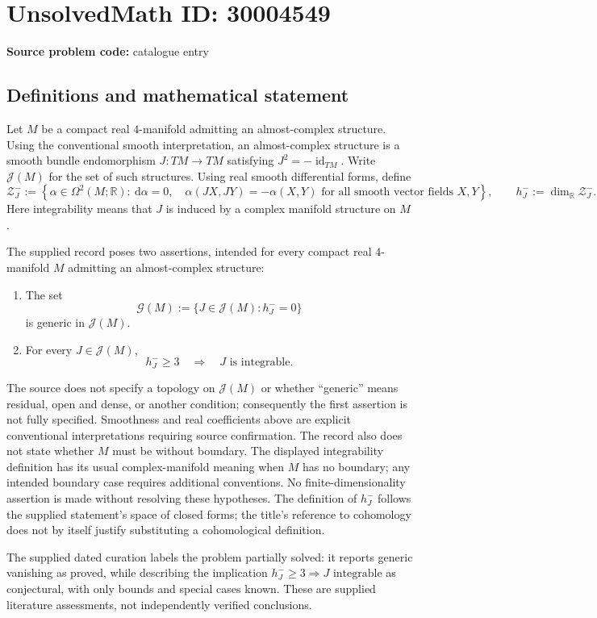 \documentclass[11pt]{article}
\newcommand{\R}{\mathbb{R}}
\begin{document}
\section*{UnsolvedMath ID: 30004549}
\textbf{Source problem code:} catalogue entry
\subsection{Definitions and mathematical statement}
Let \(M\) be a compact real \(4\)-manifold admitting an almost-complex structure. Using the conventional smooth interpretation, an almost-complex structure is a smooth bundle endomorphism \(J:TM\to TM\) satisfying \(J^2=-\operatorname{id}_{TM}\). Write \(\mathcal J(M)\) for the set of such structures. Using real smooth differential forms, define
\[
\mathcal Z_J^-:=\left\{\alpha\in\Omega^2(M;\R):\ \mathrm d\alpha=0,\quad \alpha(JX,JY)=-\alpha(X,Y)\text{ for all smooth vector fields }X,Y\right\},
\qquad h_J^-:=\dim_{\R}\mathcal Z_J^-.
\]
Here integrability means that \(J\) is induced by a complex manifold structure on \(M\).

The supplied record poses two assertions, intended for every compact real \(4\)-manifold \(M\) admitting an almost-complex structure:
\begin{enumerate}
\item The set
\[
\mathcal G(M):=\{J\in\mathcal J(M):h_J^-=0\}
\]
is generic in \(\mathcal J(M)\).
\item For every \(J\in\mathcal J(M)\),
\[
h_J^-\geq 3\quad\Longrightarrow\quad J\text{ is integrable}.
\]
\end{enumerate}
The source does not specify a topology on \(\mathcal J(M)\) or whether ``generic'' means residual, open and dense, or another condition; consequently the first assertion is not fully specified. Smoothness and real coefficients above are explicit conventional interpretations requiring source confirmation. The record also does not state whether \(M\) must be without boundary. The displayed integrability definition has its usual complex-manifold meaning when \(M\) has no boundary; any intended boundary case requires additional conventions. No finite-dimensionality assertion is made without resolving these hypotheses. The definition of \(h_J^-\) follows the supplied statement's space of closed forms; the title's reference to cohomology does not by itself justify substituting a cohomological definition.

The supplied dated curation labels the problem partially solved: it reports generic vanishing as proved, while describing the implication \(h_J^-\geq3\Rightarrow J\text{ integrable}\) as conjectural, with only bounds and special cases known. These are supplied literature assessments, not independently verified conclusions.
\end{document}
